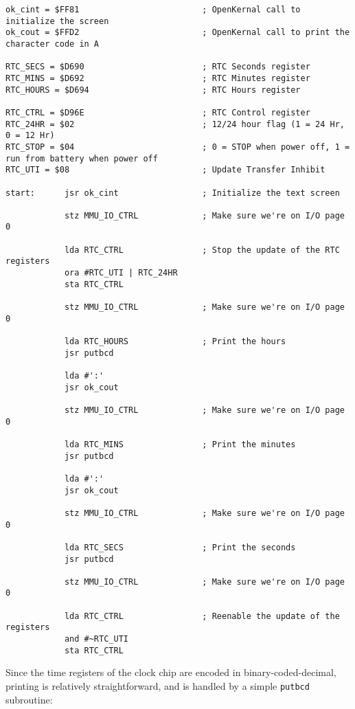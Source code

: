 \begin{verbatim}
ok_cint = $FF81							; OpenKernal call to initialize the screen
ok_cout = $FFD2							; OpenKernal call to print the character code in A

RTC_SECS = $D690						; RTC Seconds register
RTC_MINS = $D692						; RTC Minutes register
RTC_HOURS = $D694						; RTC Hours register

RTC_CTRL = $D96E						; RTC Control register
RTC_24HR = $02							; 12/24 hour flag (1 = 24 Hr, 0 = 12 Hr)
RTC_STOP = $04							; 0 = STOP when power off, 1 = run from battery when power off
RTC_UTI = $08							; Update Transfer Inhibit

start:      jsr ok_cint                 ; Initialize the text screen

            stz MMU_IO_CTRL             ; Make sure we're on I/O page 0

            lda RTC_CTRL                ; Stop the update of the RTC registers
            ora #RTC_UTI | RTC_24HR
            sta RTC_CTRL

            stz MMU_IO_CTRL				; Make sure we're on I/O page 0

            lda RTC_HOURS               ; Print the hours
            jsr putbcd

            lda #':'
            jsr ok_cout

            stz MMU_IO_CTRL				; Make sure we're on I/O page 0

            lda RTC_MINS                ; Print the minutes
            jsr putbcd

            lda #':'
            jsr ok_cout

            stz MMU_IO_CTRL				; Make sure we're on I/O page 0

            lda RTC_SECS                ; Print the seconds
            jsr putbcd

            stz MMU_IO_CTRL				; Make sure we're on I/O page 0

            lda RTC_CTRL                ; Reenable the update of the registers
            and #~RTC_UTI
            sta RTC_CTRL
\end{verbatim}

Since the time registers of the clock chip are encoded in binary-coded-decimal, printing is relatively straightforward, and is handled by a simple \verb+putbcd+ subroutine:

